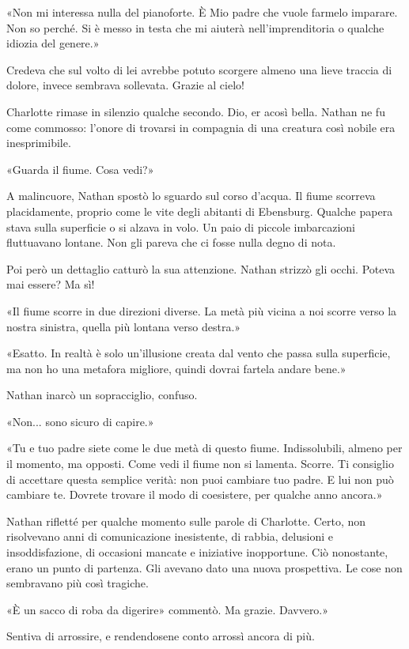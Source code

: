 \documentclass[a4paper,oneside,11pt]{memoir}
\begin{document}
«Non mi interessa nulla del pianoforte. È Mio padre che vuole farmelo imparare.
Non so perché. Si è messo in testa che mi aiuterà nell'imprenditoria o qualche
idiozia del genere.»

Credeva che sul volto di lei avrebbe potuto scorgere almeno una lieve traccia di
dolore, invece sembrava sollevata. Grazie al cielo!

Charlotte rimase in silenzio qualche secondo. Dio, er acosì bella. Nathan ne fu
come commosso: l'onore di trovarsi in compagnia di una creatura così nobile era
inesprimibile.

«Guarda il fiume. Cosa vedi?»

A malincuore, Nathan spostò lo sguardo sul corso d'acqua. Il fiume scorreva
placidamente, proprio come le vite degli abitanti di Ebensburg. Qualche papera
stava sulla superficie o si alzava in volo. Un paio di piccole imbarcazioni
fluttuavano lontane. Non gli pareva che ci fosse nulla degno di nota.

Poi però un dettaglio catturò la sua attenzione. Nathan strizzò gli occhi.
Poteva mai essere? Ma sì!

«Il fiume scorre in due direzioni diverse. La metà più vicina a noi scorre verso
la nostra sinistra, quella più lontana verso destra.»

«Esatto. In realtà è solo un'illusione creata dal vento che passa sulla
superficie, ma non ho una metafora migliore, quindi dovrai fartela andare bene.»

Nathan inarcò un sopracciglio, confuso.

«Non... sono sicuro di capire.»

«Tu e tuo padre siete come le due metà di questo fiume. Indissolubili, almeno
per il momento, ma opposti. Come vedi il fiume non si lamenta. Scorre. Ti
consiglio di accettare questa semplice verità: non puoi cambiare tuo padre. E
lui non può cambiare te. Dovrete trovare il modo di coesistere, per qualche anno
ancora.»

Nathan rifletté per qualche momento sulle parole di Charlotte. Certo, non
risolvevano anni di comunicazione inesistente, di rabbia, delusioni e
insoddisfazione, di occasioni mancate e iniziative inopportune. Ciò nonostante,
erano un punto di partenza. Gli avevano dato una nuova prospettiva. Le cose non
sembravano più così tragiche.

«È un sacco di roba da digerire» commentò. Ma grazie. Davvero.»

Sentiva di arrossire, e rendendosene conto arrossì ancora di più.
\end{document}
